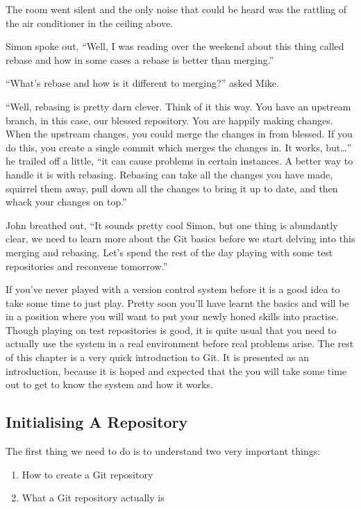 \begin{trenches}
The room went silent and the only noise that could be heard was the rattling of the air conditioner in the ceiling above.

Simon spoke out, ``Well, I was reading over the weekend about this thing called rebase and how in some cases a rebase is better than merging.''

``What's rebase and how is it different to merging?'' asked Mike.

``Well, rebasing is pretty darn clever. Think of it this way. You have an upstream branch, in this case, our blessed repository. You are happily making changes. When the upstream changes, you could merge the changes in from blessed. If you do this, you create a single commit which merges the changes in. It works, but\ldots'' he trailed off a little,
``it can cause problems in certain instances. A better way to handle it is with rebasing. Rebasing can take all the changes you have made, squirrel them away, pull down all the changes to bring it up to date, and then whack your changes on top.''

John breathed out, ``It sounds pretty cool Simon, but one thing is abundantly clear, we need to learn more about the Git basics before we start delving into this merging and rebasing. Let's spend the rest of the day playing with some test repositories and reconvene tomorrow.''
\end{trenches}

If you've never played with a version control system before it is a good idea to take some time to just play.
Pretty soon you'll have learnt the basics and will be in a position where you will want to put your newly honed skills into practise.
Though playing on test repositories is good, it is quite usual that you need to actually use the system in a real environment before real problems arise.
The rest of this chapter is a very quick introduction to Git.
It is presented as an introduction, because it is hoped and expected that the you will take some time out to get to know the system and how it works.

\subsection{Initialising A Repository}
The first thing we need to do is to understand two very important things:

\begin{enumerate}
  \item How to create a Git repository
  \item What a Git repository actually is
\end{enumerate}


